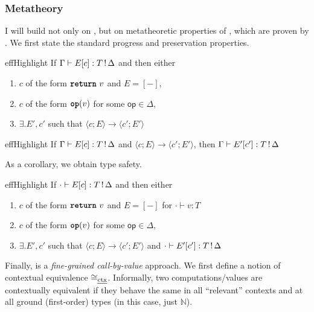 \subsubsection{Metatheory}
I will build not only on \efflang{}, but on metatheoretic properties of \efflang{}, which are proven by \citet{bauer-2014}. We first state the standard progress and preservation properties.

\renewcommand{\effconfiguration}[2]{\langle {#1}; {#2} \rangle}
\renewcommand{\transition}[2]{#1 \rightarrow #2}

\begin{theorem}[Progress]{effHighlight}\label{thm:progress}
If $\Gamma  \vdash E[c] : {T} \, ! \, {\Delta}$ and then either 
\begin{enumerate}
\item $c$ of the form $\texttt{\textbf{return}} \,\, {v}$ and $E = [-]$,
\item $c$ of the form $\textbf{\texttt{op}}({v})$ for some $\textsf{op} \in \Delta$,
\item $\exists. E', c'$ such that $\transition{\effconfiguration{c}{E}}{\effconfiguration{c'}{E'}}$
\end{enumerate}
\end{theorem}
\vspace{-\baselineskip}
\begin{theorem}[Preservation]{effHighlight}\label{thm:preservation}
If $\Gamma  \vdash E[c] : {T} \, ! \, {\Delta}$ and $\transition{\effconfiguration{c}{E}}{\effconfiguration{c'}{E'}}$, then $\Gamma  \vdash E'[c'] : {T} \, ! \, {\Delta}$
\end{theorem}
\noindent As a corollary, we obtain type safety. 
\begin{corollary}{effHighlight}\label{thm:type-safety}
  If $\cdot \vdash {E[c]}: {{T} \, ! \, {\Delta}}$ and then either 
\begin{enumerate}
\item $c$ of the form $\texttt{\textbf{return}} \,\, {v}$ and $E = [-]$ for $\cdot \vdash {v}: {T}$
\item $c$ of the form $\textbf{\texttt{op}}({v})$ for some $\textsf{op} \in \Delta$,
\item $\exists. E', c'$ such that $\transition{\effconfiguration{c}{E}}{\effconfiguration{c'}{E'}}$ and $\cdot \vdash {E'[c']}: {{T} \, ! \, {\Delta}}$
\end{enumerate}
\end{corollary}

\newcommand{\contextequiv}{\cong_{\text{\emph{ctx}}}}

Finally, \efflang{} is a \textit{fine-grained call-by-value} \citep{levy-2003} approach. We first define a notion of contextual equivalence $\contextequiv$. Informally, two computations/values are contextually equivalent if they behave the same in all ``relevant'' contexts and at all ground (first-order) types (in this case, just $\mathbb{N}$). 

